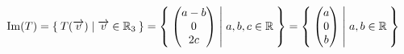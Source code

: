 \documentclass[11pt]{article}
\DeclareMathOperator{\ima}{Im}
\begin{document}
\begin{examples}
\begin{enumerate}
\(\ima(T) = \Set{ T(\overrightarrow{v}) | \overrightarrow{v} \in \mathbb{R}_3 } = \Set{ \left( \begin{matrix} a-b \\ 0 \\ 2c \end{matrix} \right) | a,b,c \in \mathbb{R} } = \Set{ \left( \begin{matrix} a\\ 0 \\ b \end{matrix} \right) | a,b \in \mathbb{R} }\)
\end{enumerate}
\end{examples}
\end{document}
